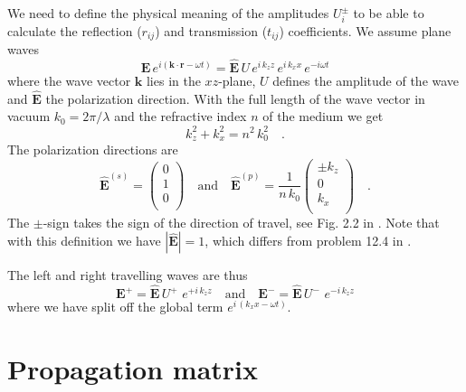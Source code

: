 We need to define the physical meaning of the amplitudes $U_i^\pm$ to be able to calculate the reflection ($r_{ij}$) and transmission ($t_{ij}$) coefficients. We assume plane waves 
\begin{equation}
\mathbf{E} \, e^{i (\mathbf{k}  \cdot \mathbf{r} - \omega t)}
=
\mathbf{\hat{E}} \, U \, e^{i \, k_z z} \, e^{i \, k_x x} \, e^{-i \omega t}
\end{equation}
where the wave vector $\mathbf{k} $ lies in the $xz$-plane, $U$ defines the amplitude of the wave and $\mathbf{\hat{E}} $  the polarization direction.
With   the full length of the wave vector in vacuum $k_0 = 2 \pi / \lambda$ and the refractive index $n$ of the medium we get
\begin{equation}
k_{z}^2 + k_{x}^2  = n^2 \, k_0^2  \quad . 
\end{equation}
The polarization directions are
\begin{equation}
\mathbf{\hat{E}}^{(s)} = \begin{pmatrix}
 0 \\ 1 \\ 0 \\
\end{pmatrix}
\quad 
\text{and}
\quad
\mathbf{\hat{E}}^{(p)} =\frac{1}{n \, k_0} \begin{pmatrix}
\pm k_z \\ 0 \\  k_x  \\
\end{pmatrix} \quad . 
\end{equation}
The $\pm$-sign takes the sign of the direction of travel, see Fig. 2.2 in \cite{Novotny-Hecht2012}. Note that with this definition we have $|\mathbf{\hat{E}}| = 1$, which differs from problem 12.4 in \cite{Novotny-Hecht2012}.

The left and right travelling waves are thus
\begin{equation}
\mathbf{E}^+ = \mathbf{\hat{E}} \, U^+ \, \, e^{+ i \, k_z z}
\quad
\text{and}
\quad
\mathbf{E}^- = \mathbf{\hat{E}} \, U^- \, \, e^{- i \, k_z z}
\end{equation}
where we have split off the global term $ e^{i \, ( k_x x - \omega t)}$.

\section{Propagation matrix}

